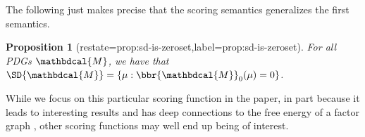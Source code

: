 \documentclass{article}
\theoremstyle{plain}
\newtheorem{prop}[theorem]{Proposition}
\theoremstyle{definition}
\theoremstyle{remark}
\newcommand{\dg}[1]{\mathbdcal{#1}}
\newcommand\Inc{\mathit{Inc}}
\newcommand{\begthm}[2]{\begin{#1}[restate=#2,label=#2]}
\numberwithin{equation}{section}
\begin{document}
        The following just makes precise that the scoring semantics
        generalizes the first semantics.
\begthm{prop}{prop:sd-is-zeroset}
For all PDGs $\dg M$, we have that $\SD{\dg M} = \{ \mu : \bbr{\dg
          M}_0(\mu) = 0\}$. 
\end{prop}
          
While we focus on this particular scoring function
in the paper, 
in part because
it leads to interesting results and has deep
connections to the free energy of a factor graph \cite{KF09},
other scoring functions may well end up being of interest. 
        
	
\end{document}
